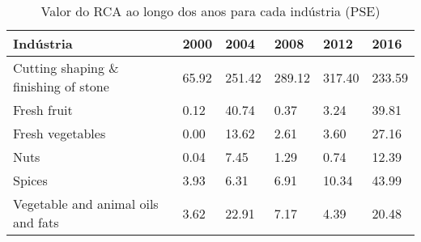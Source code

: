 \begin{table}
\centering
\caption{Valor do RCA ao longo dos anos para cada indústria (PSE)}
\label{tab:ex3-tempo-PSE}
\begin{tabular}{p{6cm}p{1.5cm}p{1.5cm}p{1.5cm}p{1.5cm}p{1.5cm}}
\toprule
                           Indústria &  2000 &   2004 &   2008 &   2012 &   2016 \\
\midrule
Cutting shaping \& finishing of stone & 65.92 & 251.42 & 289.12 & 317.40 & 233.59 \\
                         Fresh fruit &  0.12 &  40.74 &   0.37 &   3.24 &  39.81 \\
                    Fresh vegetables &  0.00 &  13.62 &   2.61 &   3.60 &  27.16 \\
                                Nuts &  0.04 &   7.45 &   1.29 &   0.74 &  12.39 \\
                              Spices &  3.93 &   6.31 &   6.91 &  10.34 &  43.99 \\
  Vegetable and animal oils and fats &  3.62 &  22.91 &   7.17 &   4.39 &  20.48 \\
\bottomrule
\end{tabular}
\end{table}
